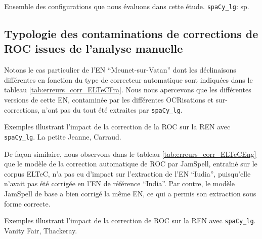 \begin{table}[h!]
    \centering
   
    \caption{Ensemble des configurations que nous évaluons dans cette étude. \texttt{spaCy\_lg}: sp.}
    \label{tab:config}
\end{table}

\subsection{Typologie des contaminations de corrections de ROC issues de l'analyse manuelle}
\label{subsec:Typologie_COR-OCR-IMPACT-NER}

Notons le cas particulier de l'EN ``Meunet-sur-Vatan'' dont les déclinaisons différentes en fonction du type de correcteur automatique sont indiquées dans le tableau \ref{tab:erreurs_corr_ELTeCFra}. Nous nous apercevons que les différentes versions de cette EN, contaminée par les différentes OCRisations et sur-corrections, n'ont pas du tout été extraites par \texttt{spaCy\_lg}.

\begin{table}[h!]
    \small
    \centering
   
     \caption{Exemples illustrant l'impact de la correction de la ROC sur la REN avec \texttt{spaCy\_lg}. {\normalfont La petite Jeanne}, Carraud.}
    \label{tab:erreurs_corr_ELTeCFra}
\end{table}

De façon similaire, nous observons dans le tableau \ref{tab:erreurs_corr_ELTeCEng} que le modèle de la correction automatique de ROC par JamSpell, entraîné sur le corpus ELTeC, n'a pas eu d'impact sur l'extraction de l'EN ``Iudia'', puisqu'elle n'avait pas été corrigée en l'EN de référence ``India''. Par contre, le modèle JamSpell de base a bien corrigé la même EN, ce qui a permis son extraction sous forme correcte.
\begin{table}[h!]
\small
    \centering
   
    \caption{Exemples illustrant l'impact de la correction de ROC sur la REN avec \texttt{spaCy\_lg}. {\normalfont Vanity Fair}, Thackeray.}
    \label{tab:erreurs_corr_ELTeCEng}
\end{table}



